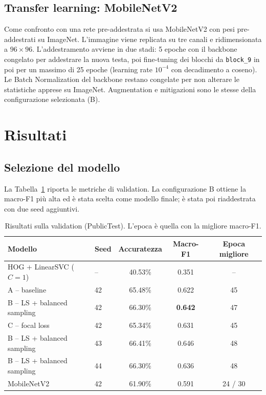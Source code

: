 \documentclass[11pt,a4paper]{article}
\begin{document}
\subsection{Transfer learning: MobileNetV2}
Come confronto con una rete pre-addestrata si usa MobileNetV2 \cite{sandler2018mobilenetv2} con pesi pre-addestrati su ImageNet. L'immagine viene replicata su tre canali e ridimensionata a $96\times96$. L'addestramento avviene in due stadi: 5 epoche con il backbone congelato per addestrare la nuova testa, poi fine-tuning dei blocchi da \texttt{block\_9} in poi per un massimo di 25 epoche (learning rate $10^{-4}$ con decadimento a coseno). Le Batch Normalization del backbone restano congelate per non alterare le statistiche apprese su ImageNet. Augmentation e mitigazioni sono le stesse della configurazione selezionata (B).

\section{Risultati}
\subsection{Selezione del modello}
La Tabella~\ref{tab:val} riporta le metriche di validation. La configurazione B ottiene la macro-F1 più alta ed è stata scelta come modello finale; è stata poi riaddestrata con due seed aggiuntivi.

\begin{table}[H]
\centering
\caption{Risultati sulla validation (PublicTest). L'epoca è quella con la migliore macro-F1.}
\label{tab:val}
\begin{tabular}{llccc}
\toprule
Modello & Seed & Accuratezza & Macro-F1 & Epoca migliore \\
\midrule
HOG + LinearSVC ($C=1$) & -- & 40.53\% & 0.351 & -- \\
A -- baseline & 42 & 65.48\% & 0.622 & 45 \\
B -- LS + balanced sampling & 42 & 66.30\% & \textbf{0.642} & 47 \\
C -- focal loss & 42 & 65.34\% & 0.631 & 45 \\
B -- LS + balanced sampling & 43 & 66.41\% & 0.646 & 48 \\
B -- LS + balanced sampling & 44 & 66.30\% & 0.636 & 48 \\
MobileNetV2 & 42 & 61.90\% & 0.591 & 24 / 30 \\
\bottomrule
\end{tabular}
\end{table}
\end{document}
